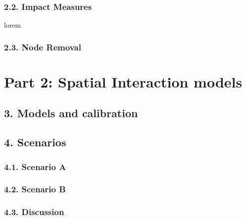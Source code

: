 \documentclass[10pt]{report}
\numberwithin{figure}{section}
\numberwithin{table}{section}
\begin{document}
\subsubsection{2.2. Impact Measures} 
lorem

\subsubsection{2.3. Node Removal} 

\section{ Part 2: Spatial Interaction models}


\subsection{3. Models and calibration}


\newpage
\subsection{4. Scenarios}
\subsubsection{4.1. Scenario A}
\subsubsection{4.2. Scenario B}
\subsubsection{4.3. Discussion}













\newpage
\printbibliography[title = {References}]
\end{document}
